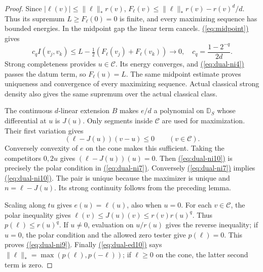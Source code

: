 \documentclass[11pt,reqno]{amsart}
\theoremstyle{definition}
\theoremstyle{remark}
\numberwithin{equation}{section}
\newcommand{\MathEqref}[1]{\begingroup\hypersetup{linkcolor=EquationLink}\hyperref[#1]{(\ref*{#1})}\endgroup}
\begin{document}
\begin{proof}
Since $|\ell(v)|\leq\|\ell\|_*r(v)$,
$F_\ell(v)\leq\|\ell\|_*r(v)-r(v)^d/d$. Thus its supremum
$L\geq F_\ell(0)=0$ is finite, and every maximizing sequence
has bounded energies. In the midpoint gap the linear term
cancels. \MathEqref{eq:midpoint} gives
\[
 c_q I(v_j,v_k)
     \leq L-\tfrac12(F_\ell(v_j)+F_\ell(v_k))\longrightarrow0,
 \quad c_q=\frac{1-2^{-q}}{2d}.
\]
Strong completeness provides $u\in\mathscr C$. Its energy
converges, and \MathEqref{eq:dual-ni4} passes the datum term, so $F_\ell(u)=L$.
The same midpoint estimate proves uniqueness and convergence
of every maximizing sequence. Actual classical strong density
also gives the same supremum over the actual classical class.

The continuous $d$-linear extension $B$ makes $e/d$ a polynomial
on $\mathbb D_S$ whose differential at $u$ is $J(u)$.
Only segments inside $\mathscr C$ are used for maximization.
Their first variation gives
\begin{equation}\label{eq:dual-ni10}
                   (\ell-J(u))(v-u)\leq0\qquad(v\in\mathscr C).
\end{equation}
Conversely convexity of $e$ on the cone makes this sufficient.
Taking the competitors $0,2u$ gives $(\ell-J(u))(u)=0$.
Then \MathEqref{eq:dual-ni10} is precisely the polar condition in \MathEqref{eq:dual-ni7}.
Conversely \MathEqref{eq:dual-ni7} implies \MathEqref{eq:dual-ni10}. The pair is unique because
the maximizer is unique and $n=\ell-J(u)$. Its strong continuity
follows from the preceding lemma.

Scaling along $tu$ gives $e(u)=\ell(u)$, also when $u=0$.
For each $v\in\mathscr C$, the polar inequality gives
$\ell(v)\leq J(u)(v)\leq r(v)r(u)^q$. Thus
$p(\ell)\leq r(u)^q$. If $u\ne0$, evaluation on $u/r(u)$
gives the reverse inequality; if $u=0$, the polar condition
and the allowed zero tester give $p(\ell)=0$. This proves
\MathEqref{eq:dual-ni9}. Finally \MathEqref{eq:dual-ed10} says
$\|\ell\|_* =\max(p(\ell),p(-\ell))$; if $\ell\geq0$ on
the cone, the latter second term is zero.
\end{proof}
\end{document}
